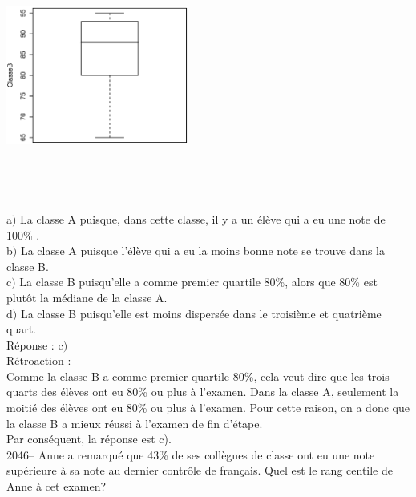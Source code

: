 \documentclass[letterpaper, 12pt]{article}
\begin{document}
\begin{center}
 \includegraphics[width=6cm,height=8cm,angle=-90]{G2045B.eps}
\end{center}


a$)$ La classe A puisque, dans cette classe, il y a un \'el\`eve qui a eu une note de 100\% . \\
b$)$ La classe A puisque l'\'el\`eve qui a eu la moins bonne note se trouve dans la classe B.\\
c$)$ La classe B puisqu'elle a comme premier quartile 80\%, alors que 80\% est plut\^ot la m\'ediane de la classe A.\\
d$)$ La classe B puisqu'elle est moins dispers\'ee dans le troisi\`eme et quatri\`eme quart.\\

R\'eponse : c$)$\\

R\'etroaction :\\
Comme la classe B a comme premier quartile 80\%, cela veut dire que les trois quarts des \'el\`eves ont eu 80\% ou plus \`a l'examen. Dans la classe A, seulement la moiti\'e des \'el\`eves ont eu 80\% ou plus \`a l'examen. Pour cette raison, on a donc que la classe B a mieux r\'eussi \`a l'examen de fin d'\'etape.\\
Par cons\'equent, la r\'eponse est c).\\


2046-- Anne a remarqu\'e que 43\% de ses coll\`egues de classe ont eu une note sup\'erieure \`a sa note au dernier contr\^ole de fran\c cais. Quel est le rang centile de Anne \`a cet examen? \\
\end{document}
